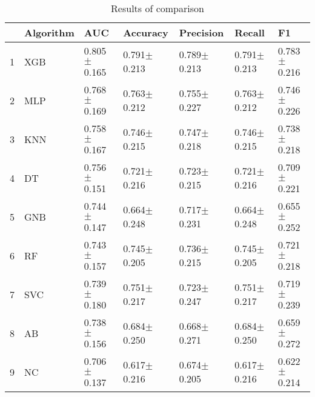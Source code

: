 \begin{table}
\footnotesize
\caption{Results of comparison}
\label{tab:comparison}
\begin{tabular}{lllllll}
\hline
 & Algorithm & AUC & Accuracy & Precision & Recall & F1 \\
\hline
1 & XGB & 0.805$\pm$0.165 & 0.791$\pm$0.213 & 0.789$\pm$0.213 & 0.791$\pm$0.213 & 0.783$\pm$0.216 \\
2 & MLP & 0.768$\pm$0.169 & 0.763$\pm$0.212 & 0.755$\pm$0.227 & 0.763$\pm$0.212 & 0.746$\pm$0.226 \\
3 & KNN & 0.758$\pm$0.167 & 0.746$\pm$0.215 & 0.747$\pm$0.218 & 0.746$\pm$0.215 & 0.738$\pm$0.218 \\
4 & DT & 0.756$\pm$0.151 & 0.721$\pm$0.216 & 0.723$\pm$0.215 & 0.721$\pm$0.216 & 0.709$\pm$0.221 \\
5 & GNB & 0.744$\pm$0.147 & 0.664$\pm$0.248 & 0.717$\pm$0.231 & 0.664$\pm$0.248 & 0.655$\pm$0.252 \\
6 & RF & 0.743$\pm$0.157 & 0.745$\pm$0.205 & 0.736$\pm$0.215 & 0.745$\pm$0.205 & 0.721$\pm$0.218 \\
7 & SVC & 0.739$\pm$0.180 & 0.751$\pm$0.217 & 0.723$\pm$0.247 & 0.751$\pm$0.217 & 0.719$\pm$0.239 \\
8 & AB & 0.738$\pm$0.156 & 0.684$\pm$0.250 & 0.668$\pm$0.271 & 0.684$\pm$0.250 & 0.659$\pm$0.272 \\
9 & NC & 0.706$\pm$0.137 & 0.617$\pm$0.216 & 0.674$\pm$0.205 & 0.617$\pm$0.216 & 0.622$\pm$0.214 \\
\hline
\end{tabular}
\end{table}
